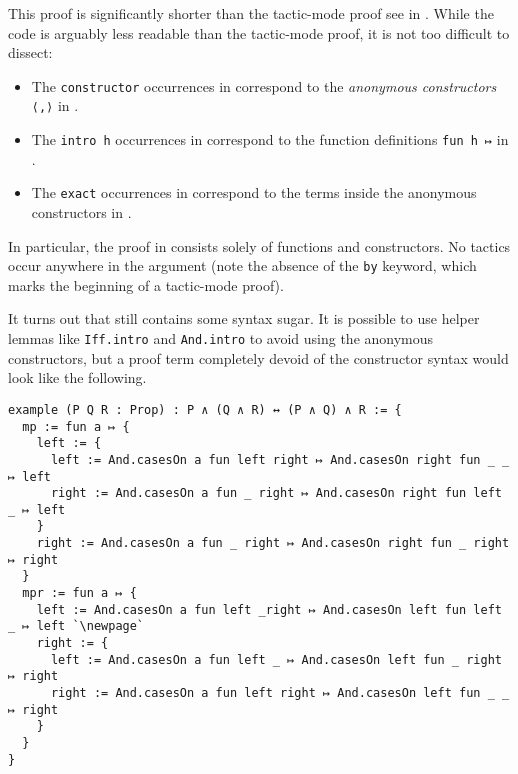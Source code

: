 
This proof is significantly shorter than the tactic-mode proof see in . While the code is arguably less readable than the tactic-mode proof, it is not too difficult to dissect:
\begin{itemize}
    \item The \lstinline|constructor| occurrences in  correspond to the \textit{anonymous constructors} \lstinline|⟨,⟩| in .

    \item The \lstinline|intro h| occurrences in  correspond to the function definitions \lstinline|fun h ↦| in .

    \item The \lstinline|exact| occurrences in  correspond to the terms inside the anonymous constructors in .
\end{itemize}

In particular, the proof in  consists solely of functions and constructors. No tactics occur anywhere in the argument (note the absence of the \lstinline|by| keyword, which marks the beginning of a tactic-mode proof).

It turns out that  still contains some syntax sugar. It is possible to use helper lemmas like \verb|Iff.intro| and \verb|And.intro| to avoid using the anonymous constructors, but a proof term completely devoid of the constructor syntax would look like the following.

\begin{lstlisting}[caption=A proof term for the associativity of $\land$, label=Ch5:Listing:And_assoc_proof_term, escapeinside=``]
example (P Q R : Prop) : P ∧ (Q ∧ R) ↔ (P ∧ Q) ∧ R := {
  mp := fun a ↦ {
    left := {
      left := And.casesOn a fun left right ↦ And.casesOn right fun _ _ ↦ left
      right := And.casesOn a fun _ right ↦ And.casesOn right fun left _ ↦ left
    }
    right := And.casesOn a fun _ right ↦ And.casesOn right fun _ right ↦ right
  }
  mpr := fun a ↦ {
    left := And.casesOn a fun left _right ↦ And.casesOn left fun left _ ↦ left `\newpage`
    right := {
      left := And.casesOn a fun left _ ↦ And.casesOn left fun _ right ↦ right
      right := And.casesOn a fun left right ↦ And.casesOn left fun _ _ ↦ right
    }
  }
}
\end{lstlisting}

